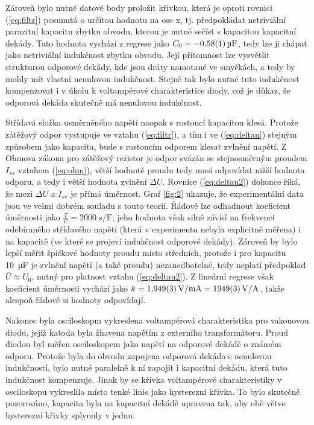 \documentclass{../concepts/prepareprotokol} %
\begin{document}
Zároveň bylo nutné datové body proložit křivkou, která je oproti rovnici (\ref{eq:filtr}) posunutá o určitou hodnotu na ose x, tj. předpokládat netriviální parazitní kapacitu zbytku obvodu, kterou je nutné sečíst s kapacitou kapacitní dekády. Tato hodnota vychází z regrese jako $C_0 = \qty{-0.58 \pm 0.01}{\micro\farad}$, tedy lze ji chápat jako netriviální indukčnost zbytku obvodu. Její přítomnost lze vysvětlit strukturou odporové dekády, kde jsou dráty namotané ve smyčkách, a tedy by mohly mít vlastní nenulovou indukčnost. Stejně tak bylo nutné tuto indukčnost kompenzovat i v úkolu k voltampérové charakteristice diody, což je důkaz, že odporová dekáda skutečně má nenulovou indukčnost.

Střídavá složka usměrněného napětí naopak s rostoucí kapacitou klesá. Protože zátěžový odpor vystupuje ve vztahu (\ref{eq:filtr}), a tím i ve (\ref{eq:deltau}) stejným způsobem jako kapacita, bude s rostoucím odporem klesat zvlnění napětí. Z Ohmova zákona pro zátěžový rezistor je odpor svázán se stejnosměrným proudem $I_{ss}$ vztahem (\ref{eq:ohm}), větší hodnotě proudu tedy musí odpovídat nižší hodnota odporu, a tedy i větší hodnota zvlnění $\Delta U$. Rovnice (\ref{eq:deltau2}) dokonce říká, že mezi $\Delta U$ a $I_{ss}$ je přímá úměrnost. Graf \ref{fig:2} ukazuje, že experimentální data jsou ve velmi dobrém souladu s touto teorií. Řádově lze odhadnout koeficient úměrnosti jako $\frac{T}{C} = \qty{2000}{s\per\farad}$, jeho hodnota však silně závisí na frekvenci odebíraného střídavého napětí (která v experimentu nebyla explicitně měřena) i na kapacitě (ve které se projeví indukčnost odporové dekády). Zároveň by bylo lepší měřit špičkové hodnoty proudu místo středních, protože i pro kapacitu \qty{10}{\micro\farad} je zvlnění napětí (a také proudu) nezanedbatelné, tedy neplatí předpoklad $\overline{U} \approx U_0$, nutný pro platnost vztahu (\ref{eq:deltau2}). Z lineární regrese však koeficient úměrnosti vychází jako $k = \qty{1.949\pm0.003}{V\per\milli\ampere} = \qty{1949\pm3}{V\per\ampere}$, takže alespoň řádově si hodnoty odpovídají.

Nakonec byla osciloskopm vykreslena voltampérová charakteristika pro vakouovou diodu, jejiž katoda byla žhavena napětím z externího transformátoru. Proud diodou byl měřen osciloskopem jako napětí na odporové dekádě o známém odporu. Protože byla do obvodu zapojena odporová dekáda s nenulovou indukčností, bylo nutné paralelně k ní zapojit i kapacitní dekádu, která tuto indukčnost kompenzuje. Jinak by se křivka voltampérové charakteristiky v osciloskopu vykreslila místo tenké linie jako hysterezní křivka. To bylo skutečně pozorováno, kapacita byla na kapacitní dekádě upravena tak, aby obě větve hysterezní křivky splynuly v jednu. 
\end{document}
